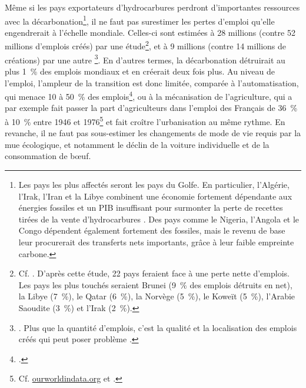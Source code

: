 \documentclass[a5paper,french,openany]{memoir}
\begin{document}
Même si les pays exportateurs d'hydrocarbures perdront d'importantes ressources avec la décarbonation\footnote{Les pays les plus affectés seront les pays du Golfe. En particulier, l'Algérie, l'Irak, l'Iran et la Libye combinent une économie fortement dépendante aux énergies fossiles et un PIB insuffisant pour surmonter la perte de recettes tirées de la vente d'hydrocarbures \citep{muttitt_equity_2020}. Des pays comme le Nigeria, l'Angola et le Congo dépendent également fortement des fossiles, mais le revenu de base leur procurerait des transferts nets importants, grâce à leur faible empreinte carbone.%
}, il ne faut pas surestimer les pertes d'emploi qu'elle engendrerait à l'échelle mondiale. Celles-ci sont estimées à 28 millions (contre 52 millions d'emplois créés) par une étude\footnote{Cf. \cite{jacobson_100_2017}. D'après cette étude, 22 pays feraient face à une perte nette d'emplois. Les pays les plus touchés seraient Brunei (9~\% des emplois détruits en net), la Libye (7~\%), le Qatar (6~\%), la Norvège (5~\%), le Koweït (5~\%), l'Arabie Saoudite (3~\%) et l'Irak (2~\%).}, et à 9 millions (contre 14 millions de créations) par une autre
\footnote{\cite{pai_meeting_2021}. Plus que la quantité d'emplois, c'est la qualité et la localisation des emplois créés qui peut poser problème \citep{haywood_welfare_2021}.}. En d'autres termes, la décarbonation détruirait au plus 1~\% des emplois mondiaux et en créerait deux fois plus. Au niveau de l'emploi, l'ampleur de la transition est donc limitée, comparée à l'automatisation, qui menace 10 à 50~\% des emplois\footnote{\cite{frey_future_2017,lassebie_what_2022,hatzius_global_2023}.}, ou à la mécanisation de l'agriculture, qui a par exemple fait passer la part d'agriculteurs dans l'emploi des Français de 36~\% à 10~\% entre 1946 et 1976\footnote{Cf. \href{https://ourworldindata.org/grapher/urbanization-last-500-years?country=~FRA}{ourworldindata.org} et \href{https://ourworldindata.org/grapher/share-of-the-labor-force-employed-in-agriculture?tab=chart&time=1800..latest&country=FRA}{\cite{herrendorf_chapter_2014}}.} et fait croître l'urbanisation au même rythme. En revanche, il ne faut pas sous-estimer les changements de mode de vie requis par la mue écologique, et notamment le déclin de la voiture individuelle et de la consommation de bœuf.
\end{document}
